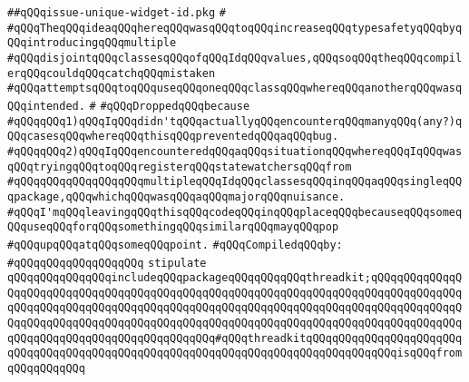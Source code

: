 \label{src/lib/x-kit/widget/gui/issue-unique-widget-id.pkg}
\verb|##qQQqissue-unique-widget-id.pkg|\newline
\verb|#|\newline
\verb|#qQQqTheqQQqideaqQQqhereqQQqwasqQQqtoqQQqincreaseqQQqtypesafetyqQQqbyqQQqintroducingqQQqmultiple|\newline
\verb|#qQQqdisjointqQQqclassesqQQqofqQQqIdqQQqvalues,qQQqsoqQQqtheqQQqcompilerqQQqcouldqQQqcatchqQQqmistaken|\newline
\verb|#qQQqattemptsqQQqtoqQQquseqQQqoneqQQqclassqQQqwhereqQQqanotherqQQqwasqQQqintended.|\newline
\verb|#|\newline
\verb|#qQQqDroppedqQQqbecause|\newline
\verb|#qQQqqQQq1)qQQqIqQQqdidn'tqQQqactuallyqQQqencounterqQQqmanyqQQq(any?)qQQqcasesqQQqwhereqQQqthisqQQqpreventedqQQqaqQQqbug.|\newline
\verb|#qQQqqQQq2)qQQqIqQQqencounteredqQQqaqQQqsituationqQQqwhereqQQqIqQQqwasqQQqtryingqQQqtoqQQqregisterqQQqstatewatchersqQQqfrom|\newline
\verb|#qQQqqQQqqQQqqQQqqQQqmultipleqQQqIdqQQqclassesqQQqinqQQqaqQQqsingleqQQqpackage,qQQqwhichqQQqwasqQQqaqQQqmajorqQQqnuisance.|\newline
\verb|#qQQqI'mqQQqleavingqQQqthisqQQqcodeqQQqinqQQqplaceqQQqbecauseqQQqsomeqQQquseqQQqforqQQqsomethingqQQqsimilarqQQqmayqQQqpop|\newline
\verb|#qQQqupqQQqatqQQqsomeqQQqpoint.|\newline
\newline
\verb|#qQQqCompiledqQQqby:|\newline
\verb|#qQQqqQQqqQQqqQQqqQQq|\newline
\newline
\newline
\newline
\verb|stipulate|\newline
\verb|qQQqqQQqqQQqqQQqincludeqQQqpackageqQQqqQQqqQQqthreadkit;qQQqqQQqqQQqqQQqqQQqqQQqqQQqqQQqqQQqqQQqqQQqqQQqqQQqqQQqqQQqqQQqqQQqqQQqqQQqqQQqqQQqqQQqqQQqqQQqqQQqqQQqqQQqqQQqqQQqqQQqqQQqqQQqqQQqqQQqqQQqqQQqqQQqqQQqqQQqqQQqqQQqqQQqqQQqqQQqqQQqqQQqqQQqqQQqqQQqqQQqqQQqqQQqqQQqqQQqqQQqqQQqqQQqqQQqqQQqqQQqqQQqqQQqqQQqqQQq#qQQqthreadkitqQQqqQQqqQQqqQQqqQQqqQQqqQQqqQQqqQQqqQQqqQQqqQQqqQQqqQQqqQQqqQQqqQQqqQQqqQQqqQQqqQQqisqQQqfromqQQqqQQqqQQq|\newline
